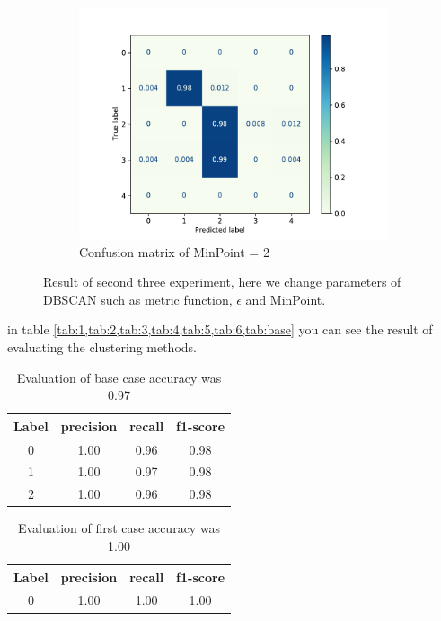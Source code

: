 \begin{figure}[h]
\begin{subfigure}{0.33\textwidth}
		\includegraphics[width=\linewidth]{figures/6-cm-MinPoint}  
		\caption{Confusion matrix of MinPoint = 2 }
		\label{fig:p2-6}
	\end{subfigure}
	\caption{Result of second three experiment, here we change parameters of DBSCAN such as metric function, $\epsilon$ and MinPoint.}
	\label{fig:panel2}
\end{figure}

in table \cref{tab:1,tab:2,tab:3,tab:4,tab:5,tab:6,tab:base} you can see the result of evaluating the clustering methods.
\begin{table}[]
	\centering
	\caption{Evaluation of base case accuracy was 0.97}
	\label{tab:base}
	\begin{tabular}{cccc}
		\textbf{Label} & \textbf{precision} & \textbf{recall} & \textbf{f1-score} \\
		\hline
		0 & 1.00 & 0.96 & 0.98 \\
		1 & 1.00 & 0.97 & 0.98 \\
		2 & 1.00 & 0.96 & 0.98
	\end{tabular}
\end{table}

\begin{table}[]
	\centering
	\caption{Evaluation of first case accuracy was 1.00}
	\label{tab:1}
	\begin{tabular}{cccc}
		\textbf{Label} & \textbf{precision} & \textbf{recall} & \textbf{f1-score} \\
		\hline
		0 & 1.00 & 1.00 & 1.00 
	\end{tabular}
\end{table}

